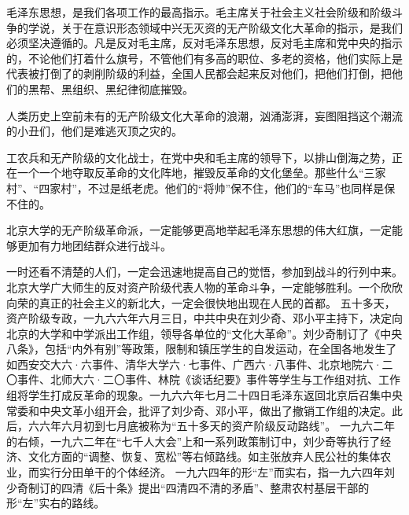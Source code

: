 \begin{maonote}
毛泽东思想，是我们各项工作的最高指示。毛主席关于社会主义社会阶级和阶级斗争的学说，关于在意识形态领域中兴无灭资的无产阶级文化大革命的指示，是我们必须坚决遵循的。凡是反对毛主席，反对毛泽东思想，反对毛主席和党中央的指示的，不论他们打着什么旗号，不管他们有多高的职位、多老的资格，他们实际上是代表被打倒了的剥削阶级的利益，全国人民都会起来反对他们，把他们打倒，把他们的黑帮、黑组织、黑纪律彻底摧毁。

人类历史上空前未有的无产阶级文化大革命的浪潮，汹涌澎湃，妄图阻挡这个潮流的小丑们，他们是难逃灭顶之灾的。

工农兵和无产阶级的文化战士，在党中央和毛主席的领导下，以排山倒海之势，正在一个一个地夺取反革命的文化阵地，摧毁反革命的文化堡垒。那些什么“三家村”、“四家村”，不过是纸老虎。他们的“将帅”保不住，他们的“车马”也同样是保不住的。

北京大学的无产阶级革命派，一定能够更高地举起毛泽东思想的伟大红旗，一定能够更加有力地团结群众进行战斗。

一时还看不清楚的人们，一定会迅速地提高自己的觉悟，参加到战斗的行列中来。北京大学广大师生的反对资产阶级代表人物的革命斗争，一定能够胜利。一个欣欣向荣的真正的社会主义的新北大，一定会很快地出现在人民的首都。
五十多天，资产阶级专政，一九六六年六月三日，中共中央在刘少奇、邓小平主持下，决定向北京的大学和中学派出工作组，领导各单位的“文化大革命”。刘少奇制订了《中央八条》，包括“内外有别”等政策，限制和镇压学生的自发运动，在全国各地发生了如西安交大六·六事件、清华大学六·七事件、广西六·八事件、北京地院六·二〇事件、北师大六·二〇事件、林院《谈话纪要》事件等学生与工作组对抗、工作组将学生打成反革命的现象。一九六六年七月二十四日毛泽东返回北京后召集中央常委和中央文革小组开会，批评了刘少奇、邓小平，做出了撤销工作组的决定。此后，六六年六月初到七月底被称为“五十多天的资产阶级反动路线”。
一九六二年的右倾，一九六二年在“七千人大会”上和一系列政策制订中，刘少奇等执行了经济、文化方面的“调整、恢复、宽松”等右倾路线。如主张放弃人民公社的集体农业，而实行分田单干的个体经济。
一九六四年的形“左”而实右，指一九六四年刘少奇制订的四清《后十条》提出“四清四不清的矛盾”、整肃农村基层干部的形“左”实右的路线。
\end{maonote}
